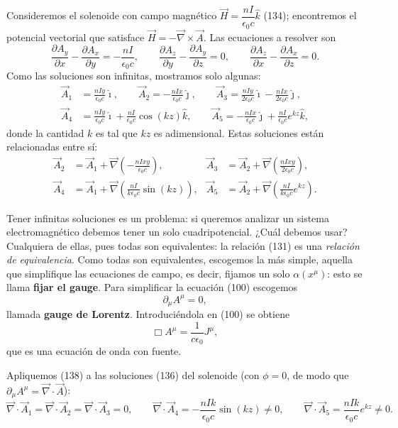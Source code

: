 \begin{ejemplo}[El solenoide]
Consideremos el solenoide con campo magnético $\vec H=\dfrac{nI}{\epsilon_0
c}\hat k$ (134); encontremos el potencial vectorial que satisface $\vec
H=-\vec\nabla\times\vec A$. Las ecuaciones a resolver son
\[
\frac{\partial A_y}{\partial x}-\frac{\partial A_x}{\partial y}=-
\frac{nI}{\epsilon_0c}, \qquad \frac{\partial A_z}{\partial y}-
\frac{\partial A_y}{\partial z}=0, \qquad \frac{\partial A_z}{\partial x}
-\frac{\partial A_x}{\partial z}=0. \tag{135}
\]
Como las soluciones son infinitas, mostramos solo algunas:
\[
\begin{aligned}
\vec A_1&=\frac{nIy}{\epsilon_0c}\hat\imath, \qquad \vec A_2=-\frac{nIx}
{\epsilon_0c}\hat\jmath, \qquad \vec A_3=\frac{nIy}{2\epsilon_0c}\hat\imath
-\frac{nIx}{2\epsilon_0c}\hat\jmath,\\
\vec A_4&=\frac{nIy}{\epsilon_0c}\hat\imath+\frac{nI}{\epsilon_0c}\cos
(kz)\hat k, \qquad \vec A_5=-\frac{nIx}{\epsilon_0c}\hat\jmath+\frac{nI}
{\epsilon_0c}e^{kz}\hat k,
\end{aligned} \tag{136}
\]
donde la cantidad $k$ es tal que $kz$ es adimensional. Estas soluciones
están relacionadas entre sí:
\[
\begin{aligned}
\vec A_2&=\vec A_1+\vec\nabla\!\left(-\frac{nIxy}{\epsilon_0c}\right),&
\vec A_3&=\vec A_2+\vec\nabla\!\left(\frac{nIxy}{2\epsilon_0c}\right),\\
\vec A_4&=\vec A_1+\vec\nabla\!\left(\frac{nI}{k\epsilon_0c}\sin(kz)
\right),& \vec A_5&=\vec A_2+\vec\nabla\!\left(\frac{nI}{k\epsilon_0c}
e^{kz}\right).
\end{aligned} \tag{137}
\]
\end{ejemplo}

Tener infinitas soluciones es un problema: si queremos analizar un sistema
electromagnético debemos tener un solo cuadripotencial. ¿Cuál debemos
usar? Cualquiera de ellas, pues todas son equivalentes: la relación
(131) es una \emph{relación de equivalencia}. Como todas son
equivalentes, escogemos la más simple, aquella que simplifique las
ecuaciones de campo, es decir, fijamos un solo $\alpha(x^\mu)$: esto se
llama \textbf{fijar el gauge}. Para simplificar la ecuación (100)
escogemos
\[
\partial_\mu A^\mu=0, \tag{138}
\]
llamada \textbf{gauge de Lorentz}. Introduciéndola en (100) se obtiene
\[
\Box A^\mu=\frac{1}{c\epsilon_0}J^\mu, \tag{139}
\]
que es una ecuación de onda con fuente.

\begin{ejemplo}
Apliquemos (138) a las soluciones (136) del solenoide (con $\phi=0$, de
modo que $\partial_\mu A^\mu=\vec\nabla\cdot\vec A$):
\[
\vec\nabla\cdot\vec A_1=\vec\nabla\cdot\vec A_2=\vec\nabla\cdot\vec A_3=0,
\qquad \vec\nabla\cdot\vec A_4=-\frac{nIk}{\epsilon_0c}\sin(kz)\neq0,
\qquad \vec\nabla\cdot\vec A_5=\frac{nIk}{\epsilon_0c}e^{kz}\neq0. \tag{140}
\]
\end{ejemplo}

